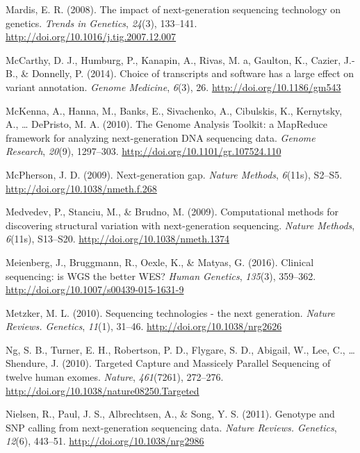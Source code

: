 \documentclass[12pt,twoside]{reedthesis}
\theoremstyle{definition}
\theoremstyle{definition}
\theoremstyle{remark}
\begin{document}
  \hypertarget{ref-Mardis2008}{}
  Mardis, E. R. (2008). The impact of next-generation sequencing
  technology on genetics. \emph{Trends in Genetics}, \emph{24}(3),
  133--141. \url{http://doi.org/10.1016/j.tig.2007.12.007}
  
  \hypertarget{ref-McCarthy2014}{}
  McCarthy, D. J., Humburg, P., Kanapin, A., Rivas, M. a, Gaulton, K.,
  Cazier, J.-B., \& Donnelly, P. (2014). Choice of transcripts and
  software has a large effect on variant annotation. \emph{Genome
  Medicine}, \emph{6}(3), 26. \url{http://doi.org/10.1186/gm543}
  
  \hypertarget{ref-McKenna2010}{}
  McKenna, A., Hanna, M., Banks, E., Sivachenko, A., Cibulskis, K.,
  Kernytsky, A., \ldots{} DePristo, M. A. (2010). The Genome Analysis
  Toolkit: a MapReduce framework for analyzing next-generation DNA
  sequencing data. \emph{Genome Research}, \emph{20}(9), 1297--303.
  \url{http://doi.org/10.1101/gr.107524.110}
  
  \hypertarget{ref-McPherson2009}{}
  McPherson, J. D. (2009). Next-generation gap. \emph{Nature Methods},
  \emph{6}(11s), S2--S5. \url{http://doi.org/10.1038/nmeth.f.268}
  
  \hypertarget{ref-Medvedev2009}{}
  Medvedev, P., Stanciu, M., \& Brudno, M. (2009). Computational methods
  for discovering structural variation with next-generation sequencing.
  \emph{Nature Methods}, \emph{6}(11s), S13--S20.
  \url{http://doi.org/10.1038/nmeth.1374}
  
  \hypertarget{ref-Meienberg2016}{}
  Meienberg, J., Bruggmann, R., Oexle, K., \& Matyas, G. (2016). Clinical
  sequencing: is WGS the better WES? \emph{Human Genetics}, \emph{135}(3),
  359--362. \url{http://doi.org/10.1007/s00439-015-1631-9}
  
  \hypertarget{ref-Metzker2010}{}
  Metzker, M. L. (2010). Sequencing technologies - the next generation.
  \emph{Nature Reviews. Genetics}, \emph{11}(1), 31--46.
  \url{http://doi.org/10.1038/nrg2626}
  
  \hypertarget{ref-Ng2010}{}
  Ng, S. B., Turner, E. H., Robertson, P. D., Flygare, S. D., Abigail, W.,
  Lee, C., \ldots{} Shendure, J. (2010). Targeted Capture and Massicely
  Parallel Sequencing of twelve human exomes. \emph{Nature},
  \emph{461}(7261), 272--276.
  \url{http://doi.org/10.1038/nature08250.Targeted}
  
  \hypertarget{ref-Nielsen2011}{}
  Nielsen, R., Paul, J. S., Albrechtsen, A., \& Song, Y. S. (2011).
  Genotype and SNP calling from next-generation sequencing data.
  \emph{Nature Reviews. Genetics}, \emph{12}(6), 443--51.
  \url{http://doi.org/10.1038/nrg2986}
  
\end{document}
